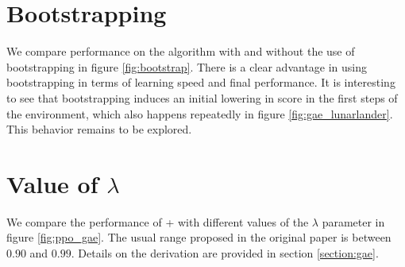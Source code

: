 %

\section{Bootstrapping}

We compare performance on the \ppo algorithm with and without the use of bootstrapping in figure \ref{fig:bootstrap}. There is a clear advantage in using bootstrapping in terms of learning speed and final performance. It is interesting to see that bootstrapping induces an initial lowering in score in the first steps of the  environment, which also happens repeatedly in figure \ref{fig:gae_lunarlander}. This behavior remains to be explored.



\section{Value of \gae $\lambda$}

We compare the performance of \ppo + \gae with different values of the $\lambda$ parameter in figure \ref{fig:ppo_gae}. The usual range proposed in the original paper \cite{gae} is between $0.90$ and $0.99$. Details on the \gae derivation are provided in section \ref{section:gae}.




